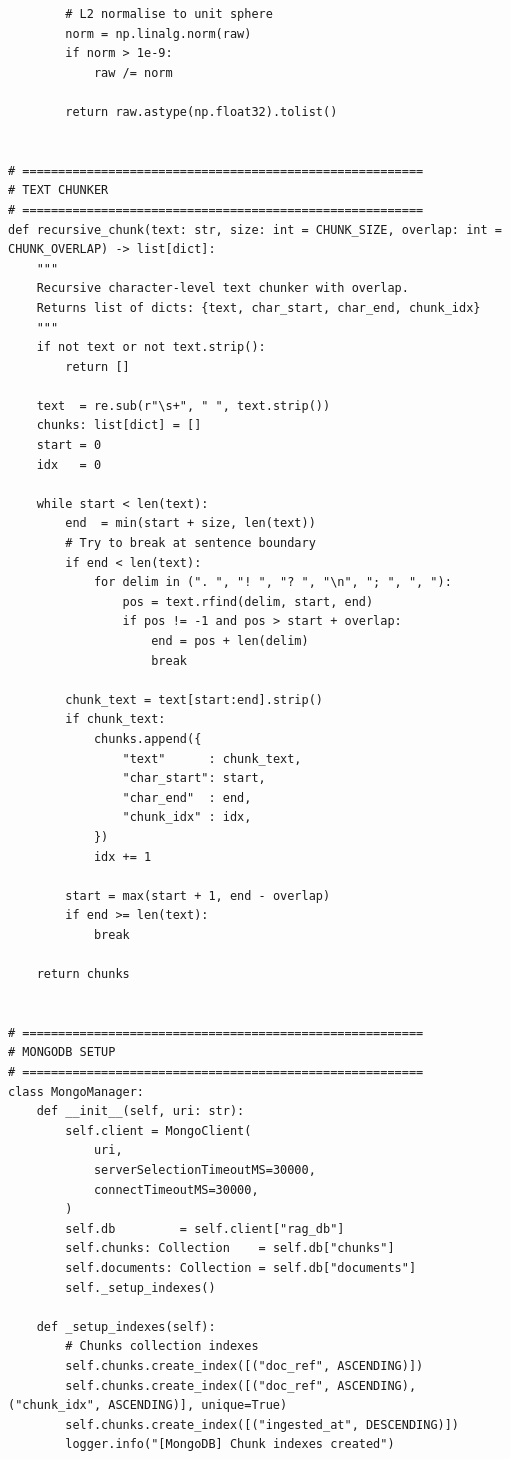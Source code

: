 \documentclass[12pt,a4paper]{report}
\begin{document}
\begin{lstlisting}
        # L2 normalise to unit sphere
        norm = np.linalg.norm(raw)
        if norm > 1e-9:
            raw /= norm

        return raw.astype(np.float32).tolist()


# ========================================================
# TEXT CHUNKER
# ========================================================
def recursive_chunk(text: str, size: int = CHUNK_SIZE, overlap: int = CHUNK_OVERLAP) -> list[dict]:
    """
    Recursive character-level text chunker with overlap.
    Returns list of dicts: {text, char_start, char_end, chunk_idx}
    """
    if not text or not text.strip():
        return []

    text  = re.sub(r"\s+", " ", text.strip())
    chunks: list[dict] = []
    start = 0
    idx   = 0

    while start < len(text):
        end  = min(start + size, len(text))
        # Try to break at sentence boundary
        if end < len(text):
            for delim in (". ", "! ", "? ", "\n", "; ", ", "):
                pos = text.rfind(delim, start, end)
                if pos != -1 and pos > start + overlap:
                    end = pos + len(delim)
                    break

        chunk_text = text[start:end].strip()
        if chunk_text:
            chunks.append({
                "text"      : chunk_text,
                "char_start": start,
                "char_end"  : end,
                "chunk_idx" : idx,
            })
            idx += 1

        start = max(start + 1, end - overlap)
        if end >= len(text):
            break

    return chunks


# ========================================================
# MONGODB SETUP
# ========================================================
class MongoManager:
    def __init__(self, uri: str):
        self.client = MongoClient(
            uri,
            serverSelectionTimeoutMS=30000,
            connectTimeoutMS=30000,
        )
        self.db         = self.client["rag_db"]
        self.chunks: Collection    = self.db["chunks"]
        self.documents: Collection = self.db["documents"]
        self._setup_indexes()

    def _setup_indexes(self):
        # Chunks collection indexes
        self.chunks.create_index([("doc_ref", ASCENDING)])
        self.chunks.create_index([("doc_ref", ASCENDING), ("chunk_idx", ASCENDING)], unique=True)
        self.chunks.create_index([("ingested_at", DESCENDING)])
        logger.info("[MongoDB] Chunk indexes created")


\end{lstlisting}
\end{document}

